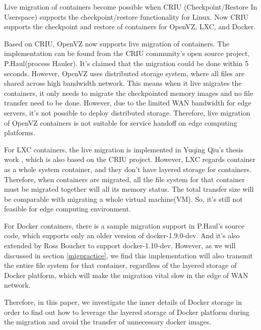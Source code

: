 Live migration of containers become possible when CRIU (Checkpoint/Restore In Userspace)\cite{criu} supports the checkpoint/restore functionality for Linux. 
Now CRIU supports the checkpoint and restore of containers for OpenVZ, LXC, and Docker. 


Based on CRIU, OpenVZ now supports live migration of containers. The implementation can be found from the CRIU community's open source project, P.Haul(process Hauler)\cite{phaul}.  It's claimed that the migration could be done within 5 seconds\cite{livmigcon}.
However, OpenVZ uses distributed storage system\cite{openvzfs}, where all files are shared across high bandwidth network. 
This means when it live migrates the containers, it only needs to migrate the checkpointed memory images and no file transfer need to be done. 
However, due to the limited WAN bandwidth for edge servers, it's not possible to deploy distributed storage. Therefore, live migration of OpenVZ containers is not suitable for service handoff on edge computing platforms.

For LXC containers, the live migration is implemented in Yuqing Qiu's thesis work \cite{qiu2016evaluating}, which is also based on the CRIU project. However, LXC regards container as a whole system container, and they don't have layered storage for containers. Therefore, when containers are migrated, all the file system for that container must be migrated together will all its memory status. The total transfer size will be comparable with migrating a whole virtual machine(VM). So, it's still not feasible for edge computing environment. 

For Docker containers, there is a sample migration support in P.Haul's source code, which supports only an older version of docker-1.9.0-dev. And it's also extended by Ross Boucher to support docker-1.10-dev. However, as we will discussed in section \ref{migpractice}, we find this implementation will also transmit the entire file system for that container, regardless of the layered storage of Docker platform, which will make the migration vital slow in the edge of WAN network. 

Therefore, in this paper, we investigate the inner details of Docker storage in order to find out how to leverage the layered storage of Docker platform during the migration and avoid the transfer of unnecessary docker images. 


